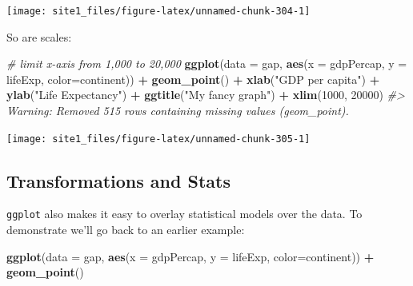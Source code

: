 \documentclass[]{book}
\newenvironment{Shaded}{\begin{snugshade}}{\end{snugshade}}
\newcommand{\KeywordTok}[1]{\textcolor[rgb]{0.13,0.29,0.53}{\textbf{#1}}}
\newcommand{\DataTypeTok}[1]{\textcolor[rgb]{0.13,0.29,0.53}{#1}}
\newcommand{\DecValTok}[1]{\textcolor[rgb]{0.00,0.00,0.81}{#1}}
\newcommand{\StringTok}[1]{\textcolor[rgb]{0.31,0.60,0.02}{#1}}
\newcommand{\CommentTok}[1]{\textcolor[rgb]{0.56,0.35,0.01}{\textit{#1}}}
\newcommand{\OperatorTok}[1]{\textcolor[rgb]{0.81,0.36,0.00}{\textbf{#1}}}
\newcommand{\NormalTok}[1]{#1}
\begin{document}
\begin{center}\texttt{[image: site1\_files/figure-latex/unnamed-chunk-304-1]} \end{center}

So are scales:

\begin{Shaded}
\begin{Highlighting}[]
\CommentTok{# limit x-axis from 1,000 to 20,000}
\KeywordTok{ggplot}\NormalTok{(}\DataTypeTok{data =}\NormalTok{ gap, }\KeywordTok{aes}\NormalTok{(}\DataTypeTok{x =}\NormalTok{ gdpPercap, }\DataTypeTok{y =}\NormalTok{ lifeExp, }\DataTypeTok{color=}\NormalTok{continent)) }\OperatorTok{+}\StringTok{ }
\StringTok{  }\KeywordTok{geom_point}\NormalTok{() }\OperatorTok{+}\StringTok{ }
\StringTok{  }\KeywordTok{xlab}\NormalTok{(}\StringTok{"GDP per capita"}\NormalTok{) }\OperatorTok{+}\StringTok{ }
\StringTok{  }\KeywordTok{ylab}\NormalTok{(}\StringTok{"Life Expectancy"}\NormalTok{) }\OperatorTok{+}\StringTok{ }
\StringTok{  }\KeywordTok{ggtitle}\NormalTok{(}\StringTok{"My fancy graph"}\NormalTok{) }\OperatorTok{+}\StringTok{ }
\StringTok{  }\KeywordTok{xlim}\NormalTok{(}\DecValTok{1000}\NormalTok{, }\DecValTok{20000}\NormalTok{)}
\CommentTok{#> Warning: Removed 515 rows containing missing values (geom_point).}
\end{Highlighting}
\end{Shaded}

\begin{center}\texttt{[image: site1\_files/figure-latex/unnamed-chunk-305-1]} \end{center}

\subsection{Transformations and Stats}\label{transformations-and-stats}

\texttt{ggplot} also makes it easy to overlay statistical models over
the data. To demonstrate we'll go back to an earlier example:

\begin{Shaded}
\begin{Highlighting}[]
\KeywordTok{ggplot}\NormalTok{(}\DataTypeTok{data =}\NormalTok{ gap, }\KeywordTok{aes}\NormalTok{(}\DataTypeTok{x =}\NormalTok{ gdpPercap, }\DataTypeTok{y =}\NormalTok{ lifeExp, }\DataTypeTok{color=}\NormalTok{continent)) }\OperatorTok{+}\StringTok{ }
\StringTok{  }\KeywordTok{geom_point}\NormalTok{()}
\end{Highlighting}
\end{Shaded}
\end{document}
